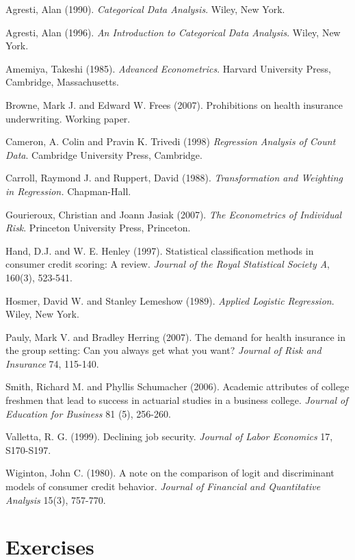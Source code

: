 \begin{multicols}{2}


Agresti, Alan (1990). \textit{Categorical Data Analysis}. Wiley, New
York.

Agresti, Alan (1996). \textit{An Introduction to Categorical Data
Analysis}. Wiley, New York.

Amemiya, Takeshi (1985). \textit{Advanced Econometrics}. Harvard
University Press, Cambridge, Massachusetts.

Browne, Mark J. and Edward W. Frees (2007). Prohibitions on health
insurance underwriting. Working paper.

Cameron, A. Colin and Pravin K. Trivedi (1998) \textit{Regression
Analysis of Count Data}. Cambridge University Press, Cambridge.

Carroll, Raymond J. and Ruppert, David (1988).
\textit{Transformation and Weighting in Regression.} Chapman-Hall.

Gourieroux, Christian and Joann Jasiak (2007). \textit{The
Econometrics of Individual Risk}. Princeton University Press,
Princeton.

Hand, D.J. and W. E. Henley (1997). Statistical classification
methods in consumer credit scoring: A review. \textit{Journal of the
Royal Statistical Society A}, 160(3), 523-541.

Hosmer, David W. and Stanley Lemeshow (1989). \textit{Applied
Logistic Regression}. Wiley, New York.

Pauly, Mark V. and Bradley Herring (2007). The demand for health
insurance in the group setting: Can you always get what you want?
\textit{Journal of Risk and Insurance} 74, 115-140.

Smith, Richard M. and Phyllis Schumacher (2006). Academic attributes
of college freshmen that lead to success in actuarial studies in a
business college. \textit{Journal of Education for Business} 81 (5),
256-260.

Valletta, R. G. (1999). Declining job security. \textit{Journal of
Labor Economics} 17, S170-S197.

Wiginton, John C. (1980). A note on the comparison of logit and
discriminant models of consumer credit behavior. \textit{Journal of
Financial and Quantitative Analysis} 15(3), 757-770.


\end{multicols}

\section{Exercises}

